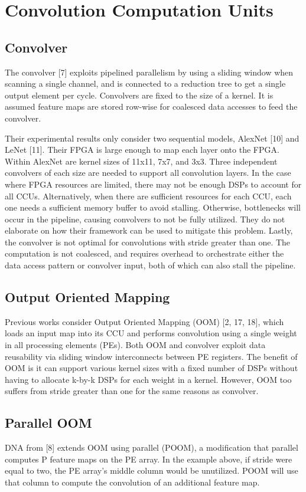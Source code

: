 \section{Convolution Computation Units}
\subsection{Convolver}
The convolver [7] exploits pipelined parallelism by using a sliding window when scanning a single channel, and is connected to a reduction tree to get a single output element per cycle. Convolvers are fixed to the size of a kernel. It is assumed feature maps are stored row-wise for coalesced data accesses to feed the convolver.

Their experimental results only consider two sequential models, AlexNet [10] and LeNet [11]. Their FPGA is large enough to map each layer onto the FPGA. Within AlexNet are kernel sizes of 11x11, 7x7, and 3x3. Three independent convolvers of each size are needed to support all convolution layers. In the case where FPGA resources are limited, there may not be enough DSPs to account for all CCUs. Alternatively, when there are sufficient resources for each CCU, each one needs a sufficient memory buffer to avoid stalling. Otherwise, bottlenecks will occur in the pipeline, causing convolvers to not be fully utilized. They do not elaborate on how their framework can be used to mitigate this problem. Lastly, the convolver is not optimal for convolutions with stride greater than one. The computation is not coalesced, and requires overhead to orchestrate either the data access pattern or convolver input, both of which can also stall the pipeline.

\subsection{Output Oriented Mapping}
Previous works consider Output Oriented Mapping (OOM) [2, 17, 18], which loads an input map into its CCU and performs convolution using a single weight in all processing elements (PEs). Both OOM and convolver exploit data reusability via sliding window interconnects between PE registers. The benefit of OOM is it can support various kernel sizes with a fixed number of DSPs without having to allocate k-by-k DSPs for each weight in a kernel. However, OOM too suffers from stride greater than one for the same reasons as convolver.

\subsection{Parallel OOM}
DNA from [8] extends OOM using parallel (POOM), a modification that parallel computes P feature maps on the PE array. In the example above, if stride were equal to two, the PE array’s middle column would be unutilized. POOM will use that column to compute the convolution of an additional feature map.

